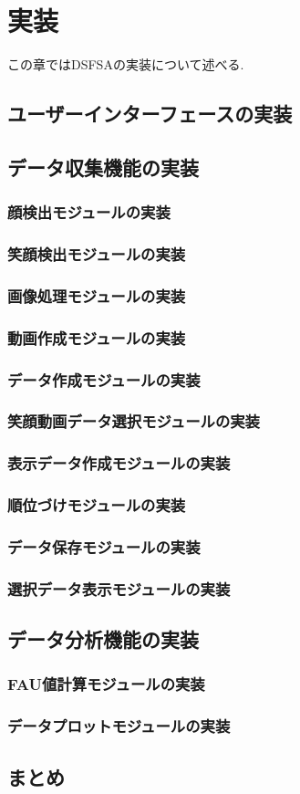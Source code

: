 \chapter{実装}
\label{chap:developing}

この章ではDSFSAの実装について述べる.

\section{ユーザーインターフェースの実装}
\section{データ収集機能の実装}
\subsection{顔検出モジュールの実装}
\subsection{笑顔検出モジュールの実装}
\subsection{画像処理モジュールの実装}
\subsection{動画作成モジュールの実装}
\subsection{データ作成モジュールの実装}
\subsection{笑顔動画データ選択モジュールの実装}
\subsection{表示データ作成モジュールの実装}
\subsection{順位づけモジュールの実装}
\subsection{データ保存モジュールの実装}
\subsection{選択データ表示モジュールの実装}

\section{データ分析機能の実装}
\subsection{FAU値計算モジュールの実装}
\subsection{データプロットモジュールの実装}
\section{まとめ}

